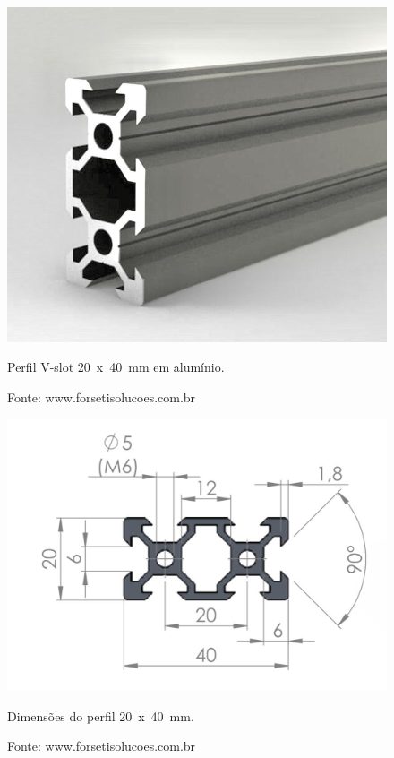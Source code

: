 \begin{figure}[H]
\centering
\includegraphics[scale = 0.3]{figuras/p20x40p2}
\caption{Perfil V-slot  20~x~40~mm em alumínio.}
\caption*{Fonte: www.forsetisolucoes.com.br}
\label{fig:p20x40p}
\end{figure}
    
\begin{figure}[H]
\centering
\includegraphics[scale = 0.4]{figuras/p20x40d}
\caption{Dimensões do perfil 20~x~40~mm.}
\caption*{Fonte: www.forsetisolucoes.com.br}
\label{fig:p20x40d}
\end{figure}
    
